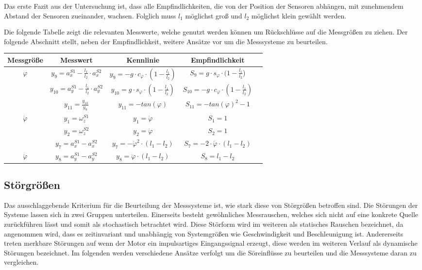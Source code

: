 Das erste Fazit aus der Untersuchung ist, dass alle Empfindlichkeiten, die von der Position der Sensoren abhängen, mit zunehmendem Abstand der Sensoren zueinander, wachsen. Folglich muss $l_1$ möglichst groß und $l_2$ möglichst klein gewählt werden.

Die folgende Tabelle zeigt die relevanten Messwerte, welche genutzt werden können um Rückschlüsse auf die Messgrößen zu ziehen. Der folgende Abschnitt stellt, neben der Empfindlichkeit, weitere Ansätze vor um die Messsysteme zu beurteilen.

\begin{table}[h!]
\centering
\def\arraystretch{1.5}
\begin{tabular}{|c|c|c|c|c|}
\hline
\textbf{Messgröße} & \textbf{Messwert} & \textbf{Kennlinie} & \textbf{Empfindlichkeit} \\ \hline
\multirow{3}{*}{$\varphi$} & $y_9 = a^{S1}_x - \frac{l_1}{l_2}\cdot a^{S2}_x$ & $y_9 = -g\cdot c_{\varphi}\cdot (1 - \frac{l_1}{l_2})$ & $S_9 = g\cdot s_{\varphi}\cdot (1 - \frac{l_1}{l_2}$) \\
\cline{2-4}
 & $y_{10} = a^{S1}_y - \frac{l_1}{l_2}\cdot a^{S2}_y$ & $y_{10} = g\cdot s_{\varphi}\cdot(1 - \frac{l_1}{l_2})$ & $S_{10} = -g\cdot c_{\varphi}\cdot (1 - \frac{l_1}{l_2})$ \\
 \cline{2-4}
 & $y_{11} = \frac{y_{10}}{y_9}$ & $y_{11} = -tan(\varphi)$ & $S_{11} = -tan(\varphi)^2 - 1$ \\
\hline
\multirow{3}{*}{$\dot{\varphi}$} & $y_1 = \omega^{S1}_z$ & $y_1 = \dot{\varphi}$ & $S_1 = 1$  \\ 
\cline{2-4}
& $y_2 = \omega^{S2}_z$ & $y_2 = \dot{\varphi}$ & $S_2 = 1$ \\
\cline{2-4}
& $y_7 = a^{S1}_x - a^{S2}_x$ & $y_7 = -\dot{\varphi}^2\cdot (l_1 - l_2)$ & $S_7 = -2\cdot \dot{\varphi}\cdot (l_1-l_2)$ \\
\hline
$\ddot{\varphi}$ & $y_8 = a^{S1}_y - a^{S2}_y$ & $y_8=\ddot{\varphi}\cdot(l_1 - l_2)$ & $S_8 = l_1 - l_2$ \\ \hline

\end{tabular}
\end{table}

\subsection{Störgrößen}
Das ausschlaggebende Kriterium für die Beurteilung der Messsysteme ist, wie stark diese von Störgrößen betroffen sind. Die Störungen der Systeme lassen sich in zwei Gruppen unterteilen. Einerseits besteht gewöhnliches Messrauschen, welches sich nicht auf eine konkrete Quelle zurückführen lässt und somit als stochastisch betrachtet wird. Diese Störform wird im weiteren als statisches Rauschen bezeichnet, da angenommen wird, dass es zeitinvariant und unabhängig von Systemgrößen wie Geschwindigkeit und Beschleunigung ist. Andererseits treten merkbare Störungen auf wenn der Motor ein impulsartiges Eingangssignal erzeugt, diese werden im weiteren Verlauf als dynamische Störungen bezeichnet. Im folgenden werden verschiedene Ansätze verfolgt um die Söreinflüsse zu beurteilen und die Messsysteme daran zu vergleichen.

